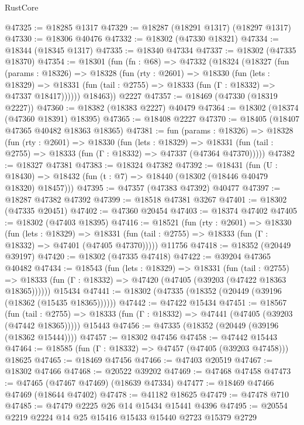 \begin{lexlean}{RustCore}
\begin{coremodule}
@47325 := @18285 @1317
@47329 := @18287 (@18291 @1317) (@18297 @1317)
@47330 := @18306 @40476
@47332 := @18302 (@47330 @18321)
@47334 := @18344 (@18345 @1317)
@47335 := @18340 @47334
@47337 := @18302 (@47335 @18370)
@47354 := @18301
    (fun (fn : @68) =>
    @47332
      (@18324
        (@18327
          (fun (params : @18326) =>
          @18328
            (fun (rty : @2601) =>
            @18330
              (fun (lets : @18329) =>
              @18331 (fun (tail : @2755) => @18333 (fun (Γ : @18332) => @47337 @18417))))))
        @18463))
    @2227
@47357 := @18469 (@47330 (@18319 @2227))
@47360 := @18382 (@18383 @2227) @40479
@47364 := @18302 (@18374 (@47360 @18391) @18395)
@47365 := @18408 @2227
@47370 := @18405 (@18407 @47365 @40482 @18363 @18365)
@47381 := fun (params : @18326) =>
  @18328
    (fun (rty : @2601) =>
    @18330
      (fun (lets : @18329) =>
      @18331 (fun (tail : @2755) => @18333 (fun (Γ : @18332) => @47337 (@47364 @47370)))))
@47382 := @18327 @47381
@47383 := @18324 @47382
@47392 := @18431
    (fun (U : @18430) => @18432 (fun (t : @7) => @18440 (@18302 (@18446 @40479 @18320) @18457)))
@47395 := @47357 (@47383 @47392) @40477
@47397 := @18287 @47382 @47392
@47399 := @18518 @47381 @3267
@47401 := @18302 (@47335 @20451)
@47402 := @47360 @20454
@47403 := @18374 @47402
@47405 := @18302 (@47403 @18395)
@47416 := @18521
    (fun (rty : @2601) =>
    @18330
      (fun (lets : @18329) =>
      @18331 (fun (tail : @2755) => @18333 (fun (Γ : @18332) => @47401 (@47405 @47370)))))
    @11756
@47418 := @18352 (@20449 @39197)
@47420 := @18302 (@47335 @47418)
@47422 := @39204 @47365 @40482
@47434 := @18543
    (fun (lets : @18329) =>
    @18331
      (fun (tail : @2755) =>
      @18333 (fun (Γ : @18332) => @47420 (@47405 (@39203 (@47422 @18363 @18365))))))
    @15434
@47441 := @18302 (@47335 (@18352 (@20449 (@39196 (@18362 (@15435 @18365))))))
@47442 := @47422 @15434
@47451 := @18567
    (fun (tail : @2755) => @18333 (fun (Γ : @18332) => @47441 (@47405 (@39203 (@47442 @18365)))))
    @15443
@47456 := @47335 (@18352 (@20449 (@39196 (@18362 @15444))))
@47457 := @18302 @47456
@47458 := @47442 @15443
@47464 := @18585 (fun (Γ : @18332) => @47457 (@47405 (@39203 @47458))) @18625
@47465 := @18469 @47456
@47466 := @47403 @20519
@47467 := @18302 @47466
@47468 := @20522 @39202
@47469 := @47468 @47458
@47473 := @47465 (@47467 @47469) (@18639 @47334)
@47477 := @18469 @47466 @47469 (@18644 @47402)
@47478 := @41182 @18625
@47479 := @47478 @710
@47485 := @47479 @2225 @26 @14 @15434 @15441 @4396
@47495 := @20554 @2219 @2224 @14 @25 @15416 @15433 @15440 @2723 @15379 @2729

\end{coremodule}
\end{lexlean}
